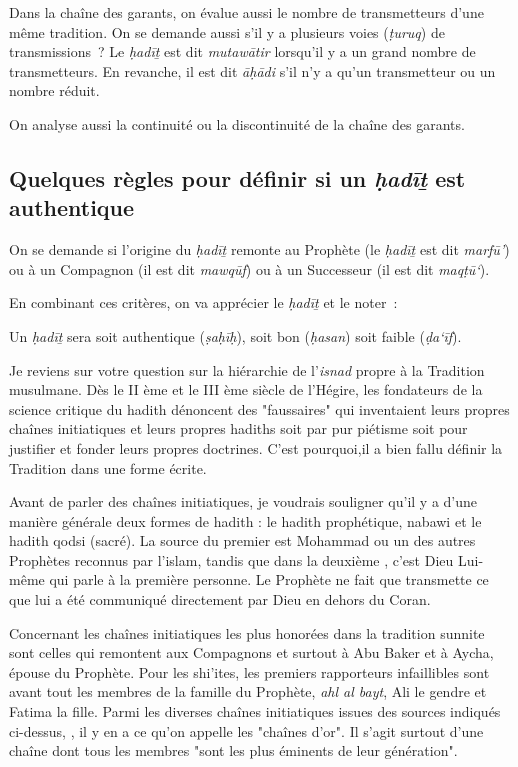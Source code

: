 Dans la chaîne des garants, on évalue aussi le nombre de transmetteurs
d'une même tradition. On se demande aussi s'il y a plusieurs voies
(\emph{ṭuruq}) de transmissions~? Le \emph{ḥadīṯ} est dit
\emph{mutawātir} lorsqu'il y a un grand nombre de transmetteurs. En
revanche, il est dit \emph{āḥādi} s'il n'y a qu'un transmetteur ou un
nombre réduit.
 

 
  On analyse aussi la continuité ou la discontinuité de la chaîne des
  garants.
 


\subsection{Quelques règles pour définir si un \emph{ḥadīṯ} est authentique}
On se demande si l'origine du \emph{ḥadīṯ} remonte au Prophète (le
\emph{ḥadīṯ} est dit \emph{marfū'}) ou à un Compagnon (il est dit
\emph{mawqūf}) ou à un Successeur (il est dit \emph{maqṭū`}).

En combinant ces critères, on va apprécier le \emph{ḥadīṯ} et le noter~:

\begin{Def}
Un \emph{ḥadīṯ} sera soit authentique (\emph{ṣaḥīḥ}), soit bon (\emph{ḥasan}) soit
faible (\emph{ḍa`īf}).

\end{Def}

Je reviens sur votre question sur la hiérarchie de l'\emph{isnad} propre à la Tradition musulmane. 
Dès le II ème et le III ème siècle de l'Hégire, les fondateurs de la science critique du hadith dénoncent des "faussaires" qui inventaient leurs propres chaînes initiatiques et leurs propres hadiths soit par pur piétisme soit pour justifier et fonder leurs propres doctrines. C'est pourquoi,il a bien fallu définir la Tradition dans une forme écrite. 

Avant de parler des chaînes initiatiques, je voudrais souligner qu'il y a d'une manière générale deux formes de hadith : le hadith prophétique, nabawi et le hadith qodsi (sacré). La source du premier est Mohammad ou un des autres Prophètes reconnus par l'islam, tandis que dans la deuxième , c'est Dieu Lui-même qui parle à la première personne. Le Prophète ne fait que transmette ce que lui a été communiqué directement par Dieu en dehors du Coran. 

Concernant les chaînes initiatiques les plus honorées dans la tradition sunnite sont celles qui remontent aux Compagnons et surtout à Abu Baker et à Aycha, épouse du Prophète. Pour les shi'ites, les premiers rapporteurs infaillibles sont avant tout les membres de la famille du Prophète, \textit{ahl al bayt}, Ali le gendre et Fatima la fille.  
Parmi les diverses chaînes initiatiques issues des sources indiqués ci-dessus, , il y en a ce qu'on appelle les "chaînes d'or". Il s'agit surtout d'une chaîne dont tous les membres "sont les plus éminents de leur génération".

